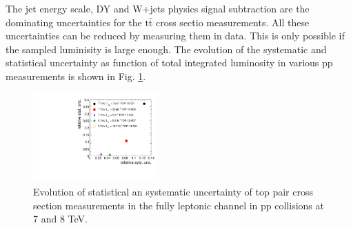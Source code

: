 The jet energy scale, DY and W+jets physics signal subtraction are the dominating uncertainties for the $\mathrm{t}\bar{\mathrm{t}}$ cross sectio measurements. All these uncertainties can be reduced by measuring them in data. This is only possible if the sampled luminisity is large enough. The evolution of the systematic and statistical uncertainty as function of total integrated luminosity in various pp measurements is shown in Fig. \ref{fig:ttStatSyst}.
\begin{figure}[h!]
\begin{center}
  \includegraphics[width= 0.43\textwidth]{figures/top/topToLLXSecUncertaintiesPP.pdf}
  \caption{Evolution of statistical an systematic uncertainty of top pair cross section measurements in the fully leptonic channel in pp collisions at 7 and 8 TeV.
  }
\label{fig:ttStatSyst}
\end{center}
\end{figure}
